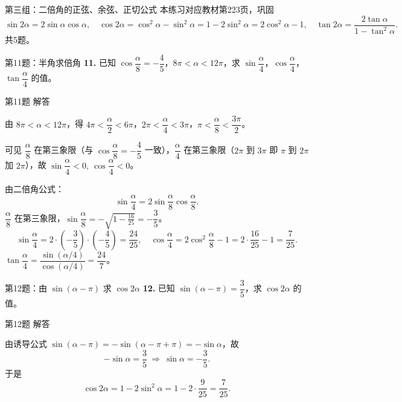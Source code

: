 \documentclass[10pt,aspectratio=169,serif]{beamer}
\begin{document}
\begin{frame}{第三组：二倍角的正弦、余弦、正切公式}
本练习对应教材第223页，巩固
\[
\sin 2\alpha=2\sin\alpha\cos\alpha,\quad
\cos 2\alpha=\cos^2\alpha-\sin^2\alpha=1-2\sin^2\alpha=2\cos^2\alpha-1,\quad
\tan 2\alpha=\frac{2\tan\alpha}{1-\tan^2\alpha}.
\]
共5题。
\end{frame}

\begin{frame}[t]{第11题：半角求倍角}
\textbf{11.} 已知 $\cos\dfrac{\alpha}{8}=-\dfrac45$，$8\pi<\alpha<12\pi$，求 $\sin\dfrac{\alpha}{4}$，$\cos\dfrac{\alpha}{4}$，$\tan\dfrac{\alpha}{4}$ 的值。
\end{frame}

\begin{frame}[t]{第11题 解答}
\begin{tcolorbox}[colback=orange!10,colframe=orange,title=\textbf{解}]
由 $8\pi<\alpha<12\pi$，得 $4\pi<\dfrac{\alpha}{2}<6\pi$，$2\pi<\dfrac{\alpha}{4}<3\pi$，$\pi<\dfrac{\alpha}{8}<\dfrac{3\pi}{2}$。

可见 $\dfrac{\alpha}{8}$ 在第三象限（与 $\cos\dfrac{\alpha}{8}=-\dfrac45$ 一致），$\dfrac{\alpha}{4}$ 在第三象限（$2\pi$ 到 $3\pi$ 即 $\pi$ 到 $2\pi$ 加 $2\pi$），故 $\sin\dfrac{\alpha}{4}<0,\ \cos\dfrac{\alpha}{4}<0$。

由二倍角公式：
\[
\sin\frac{\alpha}{4}=2\sin\frac{\alpha}{8}\cos\frac{\alpha}{8}.
\]
$\dfrac{\alpha}{8}$ 在第三象限，$\sin\dfrac{\alpha}{8}=-\sqrt{1-\frac{16}{25}}=-\dfrac35$。
\[
\sin\frac{\alpha}{4}=2\cdot\!\left(-\frac35\right)\!\cdot\!\left(-\frac45\right)=\frac{24}{25},\quad
\cos\frac{\alpha}{4}=2\cos^2\frac{\alpha}{8}-1=2\cdot\frac{16}{25}-1=\frac7{25}.
\]
$\tan\dfrac{\alpha}{4}=\dfrac{\sin(\alpha/4)}{\cos(\alpha/4)}=\dfrac{24}{7}$。
\end{tcolorbox}
\end{frame}

\begin{frame}[t]{第12题：由 $\sin(\alpha-\pi)$ 求 $\cos 2\alpha$}
\textbf{12.} 已知 $\sin(\alpha-\pi)=\dfrac35$，求 $\cos 2\alpha$ 的值。
\end{frame}

\begin{frame}[t]{第12题 解答}
\begin{tcolorbox}[colback=orange!10,colframe=orange,title=\textbf{解}]
由诱导公式 $\sin(\alpha-\pi)=-\sin(\alpha-\pi+\pi)=-\sin\alpha$，故
\[
-\sin\alpha=\frac35\ \Longrightarrow\ \sin\alpha=-\frac35.
\]
于是
\[
\cos 2\alpha=1-2\sin^2\alpha=1-2\cdot\frac{9}{25}=\frac{7}{25}.
\]
\end{tcolorbox}
\end{frame}
\end{document}
